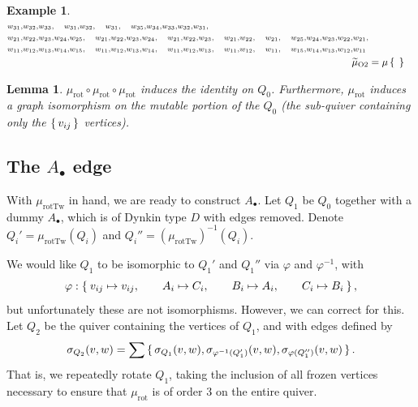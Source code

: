 \documentclass{amsart}
\theoremstyle{plain}
\newtheorem{lemma}[theorem]{Lemma}
\theoremstyle{definition}
\newtheorem{example}[theorem]{Example}
\theoremstyle{remark}
\newcommand{\murot}{{\mu_{\text{rot}}}}
\newcommand{\murottwist}{{\mu_{\text{rotTw}}}}
\newcommand{\muint}[1]{\widetilde{\mu}_{\text{#1}}}
\begin{document}
\begin{example}
\begin{align*}
{\begin{subarray}{l}
w_{31}, w_{32}, w_{33}, \quad
w_{31}, w_{32}, \quad
w_{31}, \quad
w_{35}, w_{34}, w_{33}, w_{32}, w_{31}, \\
\\
w_{21}, w_{22}, w_{23}, w_{24}, w_{25}, \quad
w_{21}, w_{22}, w_{23}, w_{24}, \quad
w_{21}, w_{22}, w_{23}, \quad
w_{21}, w_{22}, \quad
w_{21}, \quad
w_{25}, w_{24}, w_{23}, w_{22}, w_{21}, \\
\\
w_{11}, w_{12}, w_{13}, w_{14}, w_{15}, \quad
w_{11}, w_{12}, w_{13}, w_{14}, \quad
w_{11}, w_{12}, w_{13}, \quad
w_{11}, w_{12}, \quad
w_{11}, \quad
w_{15}, w_{14}, w_{13}, w_{12}, w_{11} \\
        \end{subarray}
      } \\
      \muint{O2} &= \mu\Set{ }
    \end{align*}
  \end{example}

  \begin{lemma}
    \label{lem:murot-works-for-making-Q}
    $\murot \circ \murot \circ \murot$ induces the identity on $Q_0$.
    Furthermore, $\murot$ induces a graph isomorphism on the mutable
    portion of the $Q_0$ (the sub-quiver containing only the
    $\set{v_{ij}}$ vertices).
  \end{lemma}

  \subsection{The \texorpdfstring{$A_{\bullet}$}{A.} edge}

  \label{sec:the-A-edge}

  With $\murottwist$ in hand, we are ready to construct $A_{\bullet}$.
  Let $Q_1$ be $Q_0$ together with a dummy $A_{\bullet}$, which is of
  Dynkin type $D$ with edges removed. Denote $Q_i' = \murottwist(Q_i)$
  and $Q_i'' = (\murottwist)^{-1}(Q_i)$.

  We would like $Q_1$ to be isomorphic to $Q_1'$ and $Q_1''$ via
  $\varphi$ and $\varphi^{-1}$, with \[ \varphi: \Set{v_{ij} \mapsto
      v_{ij}, \qquad A_i \mapsto C_i, \qquad B_i \mapsto A_i, \qquad C_i
      \mapsto B_i}, \] but unfortunately these are not isomorphisms.
  However, we can correct for this. Let $Q_2$ be the quiver containing
  the vertices of $Q_1$, and with edges defined by \[ \sigma_{Q_2}(v, w)
    = \sum \set{\sigma_{Q_1}(v,w), \sigma_{\varphi^{-1}(Q_1')}(v,w),
      \sigma_{\varphi(Q_1'')}(v,w)}. \] That is, we repeatedly rotate
  $Q_1$, taking the inclusion of all frozen vertices necessary to ensure
  that $\murot$ is of order $3$ on the entire quiver.
\end{document}
